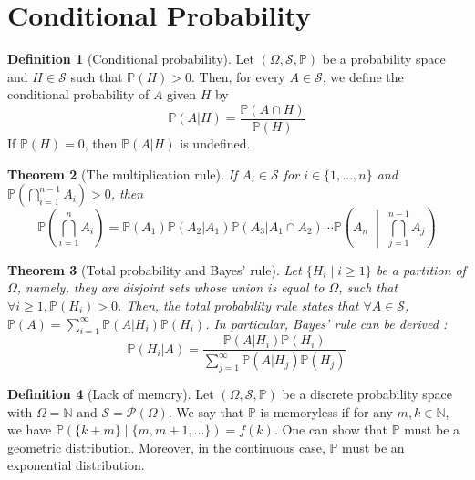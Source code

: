 \documentclass[paper=a4, fontsize=12pt]{scrartcl} %
\newcommand{\bra}[1]{\left(#1\right)}
\newtheorem{thm}{Theorem}[section]
\theoremstyle{definition}
\newtheorem{defn}[thm]{Definition}
\theoremstyle{remark}
\newcommand{\N}{\mathbb{N}}
\newcommand{\mS}{\mathcal{S}}
\renewcommand{\P}{\mathbb{P}}
\numberwithin{equation}{section} %
\numberwithin{figure}{section} %
\numberwithin{table}{section} %
\begin{document}
\section{Conditional Probability}
\begin{defn}[Conditional probability]
	Let $(\Omega, \mS, \P)$ be a probability space and $H \in \mS$ such that $\P(H) > 0$. Then, for every $A \in \mS$, we define the conditional probability of $A$ given $H$ by $$\P(A \vert H) = \frac{\P(A \cap H)}{\P(H)}$$
	If $\P(H) = 0$, then $\P(A \vert H)$ is undefined.
\end{defn}
\begin{thm}[The multiplication rule]
	If $A_i \in \mS$ for $i \in \{1, \dots, n\}$ and $\P\bra{\bigcap_{i=1}^{n-1}A_i} > 0$, then 
	$$\P\bra{\bigcap_{i=1}^{n}A_i} = \P(A_1)\P(A_2 \vert A_1)\P(A_3 \vert A_1 \cap A_2) \cdots \P\bra{A_n \;\middle\vert\; \bigcap_{j=1}^{n-1}A_j}$$
\end{thm}
\begin{thm}[Total probability and Bayes' rule]
	Let $\{H_i \mid i \geq 1\}$ be a partition of $\Omega$, namely, they are disjoint sets whose union is equal to $\Omega$, such that $\forall i \geq 1, \P(H_i) > 0$. Then, the total probability rule states that $\forall A \in \mS$, $\P(A) = \sum_{i=1}^{\infty} \P(A \vert H_i)\P(H_i)$. In particular, Bayes' rule can be derived : 
	$$\P(H_i \vert A) = \frac{\P(A \vert H_i)\P(H_i)}{\sum_{j=1}^{\infty} \P(A \vert H_j) \P(H_j)}$$
\end{thm}
\begin{defn}[Lack of memory]
	Let $(\Omega, \mS, \P)$ be a discrete probability space with $\Omega = \N$ and $\mS = \mathcal{P}(\Omega)$. We say that $\P$ is memoryless if for any $m,k\in \N$, we have $\P\bra{\{k+m\} \mid \{m,m+1,\dots\}} = f(k)$. One can show that $\P$ must be a geometric distribution. Moreover, in the continuous case, $\P$ must be an exponential distribution.
\end{defn}
\end{document}
